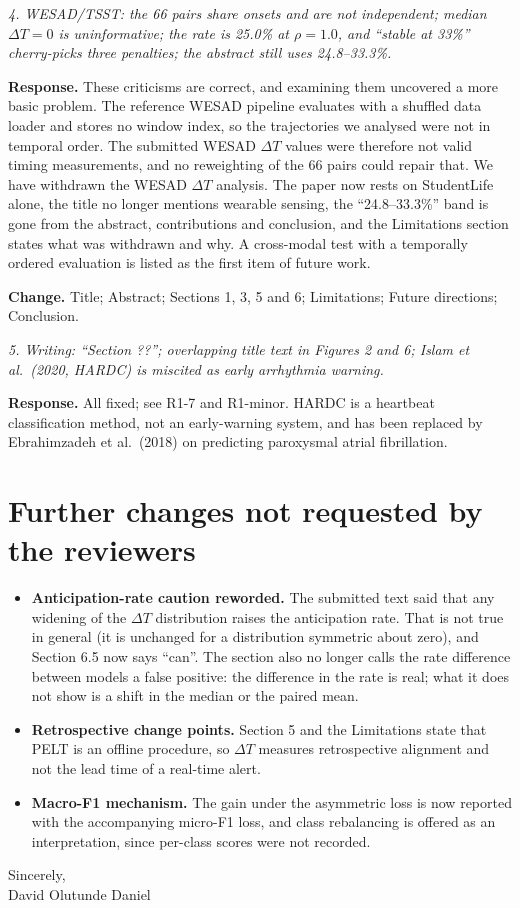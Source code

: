 \documentclass[11pt]{article}
\newenvironment{comment}{\par\medskip\noindent\begin{minipage}{\linewidth}\itshape\color{black!70}}{\end{minipage}\par\smallskip}
\newcommand{\dt}{$\Delta T$}
\newcommand{\resp}{\noindent\textbf{Response.} }
\newcommand{\change}{\par\noindent\textbf{Change.} }
\begin{document}
\begin{comment}4. WESAD/TSST: the 66 pairs share onsets and are not
independent; median $\Delta T=0$ is uninformative; the rate is 25.0\% at
$\rho=1.0$, and ``stable at 33\%'' cherry-picks three penalties; the
abstract still uses 24.8--33.3\%.\end{comment}
\resp These criticisms are correct, and examining them uncovered a more
basic problem. The reference WESAD pipeline evaluates with a shuffled
data loader and stores no window index, so the trajectories we analysed
were not in temporal order. The submitted WESAD \dt{} values were
therefore not valid timing measurements, and no reweighting of the 66
pairs could repair that. We have withdrawn the WESAD \dt{} analysis.
The paper now rests on StudentLife alone, the title no longer mentions
wearable sensing, the ``24.8--33.3\%'' band is gone from the abstract,
contributions and conclusion, and the Limitations section states what
was withdrawn and why. A cross-modal test with a temporally ordered
evaluation is listed as the first item of future work.
\change Title; Abstract; Sections 1, 3, 5 and 6; Limitations; Future
directions; Conclusion.

\begin{comment}5. Writing: ``Section ??''; overlapping title text in
Figures 2 and 6; Islam et al.\ (2020, HARDC) is miscited as early
arrhythmia warning.\end{comment}
\resp All fixed; see R1-7 and R1-minor. HARDC is a heartbeat
classification method, not an early-warning system, and has been
replaced by Ebrahimzadeh et al.\ (2018) on predicting paroxysmal atrial
fibrillation.

\section*{Further changes not requested by the reviewers}
\begin{itemize}[leftmargin=*,itemsep=1pt]
\item \textbf{Anticipation-rate caution reworded.} The submitted text
said that any widening of the \dt{} distribution raises the
anticipation rate. That is not true in general (it is unchanged for a
distribution symmetric about zero), and Section 6.5 now says ``can''.
The section also no longer calls the rate difference between models a
false positive: the difference in the rate is real; what it does not
show is a shift in the median or the paired mean.
\item \textbf{Retrospective change points.} Section 5 and the
Limitations state that PELT is an offline procedure, so \dt{} measures
retrospective alignment and not the lead time of a real-time alert.
\item \textbf{Macro-F1 mechanism.} The gain under the asymmetric loss is
now reported with the accompanying micro-F1 loss, and class rebalancing
is offered as an interpretation, since per-class scores were not
recorded.
\end{itemize}

\bigskip
Sincerely,\\
David Olutunde Daniel
\end{document}
